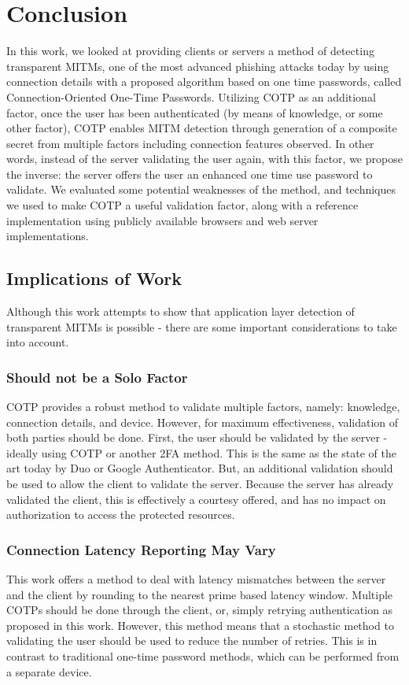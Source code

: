 \documentclass[a4paper, 11pt]{article} 				%
\begin{document}
\section{Conclusion}
In this work, we looked at providing clients or servers a method of detecting transparent MITMs, one of the most advanced phishing attacks today by using connection details with a proposed algorithm based on one time passwords, called Connection-Oriented One-Time Passwords. Utilizing COTP as an additional factor, once the user has been authenticated (by means of knowledge, or some other factor), COTP enables MITM detection through generation of a composite secret from multiple factors including connection features observed. In other words, instead of the server validating the user again, with this factor, we propose the inverse: the server offers the user an enhanced one time use password to validate. We evaluated some potential weaknesses of the method, and techniques we used to make COTP a useful validation factor, along with a reference implementation using publicly available browsers and web server implementations.

\subsection{Implications of Work}
Although this work attempts to show that application layer detection of transparent MITMs is possible - there are some important considerations to take into account.

\subsubsection{Should not be a Solo Factor}
COTP provides a robust method to validate multiple factors, namely: knowledge, connection details, and device. However, for maximum effectiveness, validation of both parties should be done. First, the user should be validated by the server - ideally using COTP or another 2FA method. This is the same as the state of the art today by Duo or Google Authenticator. But, an additional validation should be used to allow the client to validate the server. Because the server has already validated the client, this is effectively a courtesy offered, and has no impact on authorization to access the protected resources.

\subsubsection{Connection Latency Reporting May Vary}
This work offers a method to deal with latency mismatches between the server and the client by rounding to the nearest prime based latency window. Multiple COTPs should be done through the client, or, simply retrying authentication as proposed in this work. However, this method means that a stochastic method to validating the user should be used to reduce the number of retries. This is in contrast to traditional one-time password methods, which can be performed from a separate device. 
\end{document}
